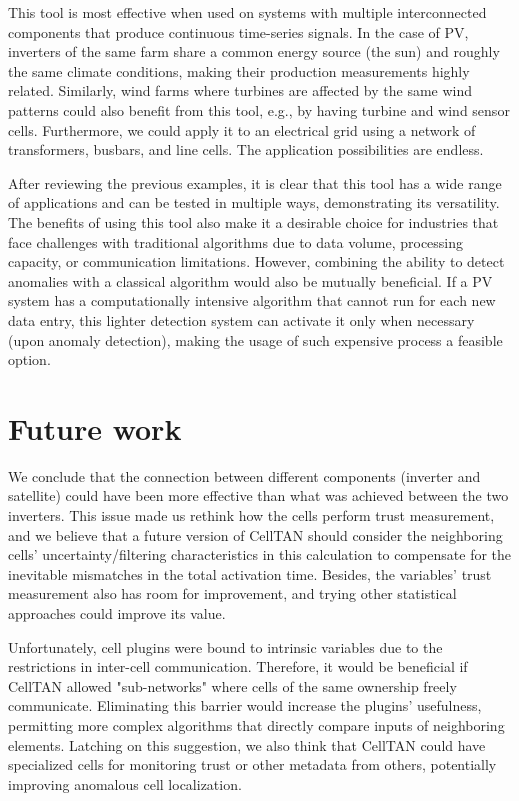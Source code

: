 This tool is most effective when used on systems with multiple interconnected components that produce continuous time-series signals. In the case of PV, inverters of the same farm share a common energy source (the sun) and roughly the same climate conditions, making their production measurements highly related. Similarly, wind farms where turbines are affected by the same wind patterns could also benefit from this tool, e.g., by having turbine and wind sensor cells. Furthermore, we could apply it to an electrical grid using a network of transformers, busbars, and line cells. The application possibilities are endless.

After reviewing the previous examples, it is clear that this tool has a wide range of applications and can be tested in multiple ways, demonstrating its versatility. The benefits of using this tool also make it a desirable choice for industries that face challenges with traditional algorithms due to data volume, processing capacity, or communication limitations. However, combining the ability to detect anomalies with a classical algorithm would also be mutually beneficial. If a PV system has a computationally intensive algorithm that cannot run for each new data entry, this lighter detection system can activate it only when necessary (upon anomaly detection), making the usage of such expensive process a feasible option.

\section{Future work}

We conclude that the connection between different components (inverter and satellite) could have been more effective than what was achieved between the two inverters. This issue made us rethink how the cells perform trust measurement, and we believe that a future version of CellTAN should consider the neighboring cells' uncertainty/filtering characteristics in this calculation to compensate for the inevitable mismatches in the total activation time. Besides, the variables' trust measurement also has room for improvement, and trying other statistical approaches could improve its value.

Unfortunately, cell plugins were bound to intrinsic variables due to the restrictions in inter-cell communication. Therefore, it would be beneficial if CellTAN allowed "sub-networks" where cells of the same ownership freely communicate. Eliminating this barrier would increase the plugins' usefulness, permitting more complex algorithms that directly compare inputs of neighboring elements. Latching on this suggestion, we also think that CellTAN could have specialized cells for monitoring trust or other metadata from others, potentially improving anomalous cell localization.

